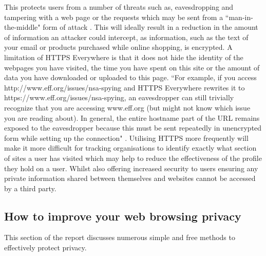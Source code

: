 \documentclass[12pt]{article}
\begin{document}
This protects users from a number of threats such as, eavesdropping and tampering with a web page or the requests which may be sent from a ``man-in-the-middle" form of attack \parencite{httpsEverywhere}. This will ideally result in a reduction in the amount of information an attacker could intercept, as information, such as the text of your email or products purchased while online shopping, is encrypted. A limitation of HTTPS Everywhere is that it does not hide the identity of the webpages you have visited, the time you have spent on this site or the amount of data you have downloaded or uploaded to this page. ``For example, if you access http://www.eff.org/issues/nsa-spying and HTTPS Everywhere rewrites it to https://www.eff.org/issues/nsa-spying, an eavesdropper can still trivially recognize that you are accessing www.eff.org (but might not know which issue you are reading about). In general, the entire hostname part of the URL remains exposed to the eavesdropper because this must be sent repeatedly in unencrypted form while setting up the connection" \parencite{httpsEverywhere}. Utilising HTTPS more frequently will make it more difficult for tracking organisations to identify exactly what section of sites a user has visited which may help to reduce the effectiveness of the profile they hold on a user. Whilst also offering increased security to users ensuring any private information shared between themselves and websites cannot be accessed by a third party.

\subsection{How to improve your web browsing privacy}
This section of the report discusses numerous simple and free methods to effectively protect privacy. 
\end{document}
